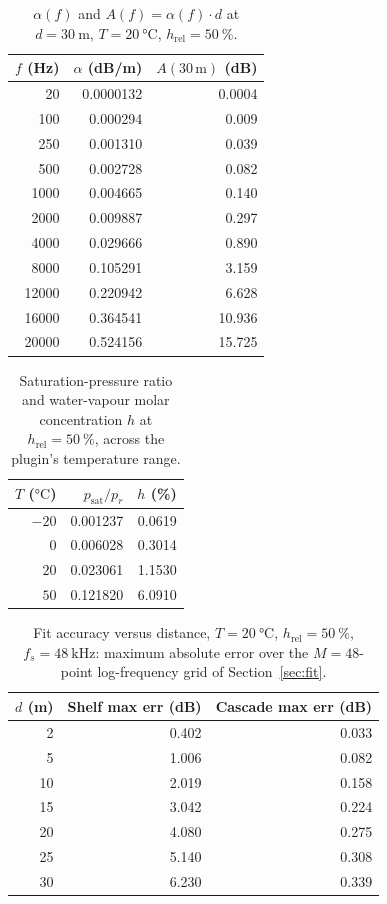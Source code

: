 \documentclass[11pt,a4paper]{article}
\begin{document}
\begin{table}[h]
\centering
\caption{$\alpha(f)$ and $A(f)=\alpha(f)\cdot d$ at $d=\SI{30}{\meter}$, $T=\SI{20}{\celsius}$, $h_\text{rel}=\SI{50}{\percent}$.}
\label{tab:alpha20}
\begin{tabular}{@{}rrr@{}}
\toprule
$f$ (Hz) & $\alpha$ (dB/m) & $A(30\,\text{m})$ (dB) \\
\midrule
20     & 0.0000132 & 0.0004 \\
100    & 0.000294  & 0.009  \\
250    & 0.001310  & 0.039  \\
500    & 0.002728  & 0.082  \\
1000   & 0.004665  & 0.140  \\
2000   & 0.009887  & 0.297  \\
4000   & 0.029666  & 0.890  \\
8000   & 0.105291  & 3.159  \\
12000  & 0.220942  & 6.628  \\
16000  & 0.364541  & 10.936 \\
20000  & 0.524156  & 15.725 \\
\bottomrule
\end{tabular}
\end{table}

\begin{table}[h]
\centering
\caption{Saturation-pressure ratio and water-vapour molar concentration $h$ at $h_\text{rel}=\SI{50}{\percent}$, across the plugin's temperature range.}
\label{tab:humidity}
\begin{tabular}{@{}rrr@{}}
\toprule
$T$ ($\si{\celsius}$) & $p_\text{sat}/p_r$ & $h$ (\%) \\
\midrule
$-20$ & 0.001237 & 0.0619 \\
$0$   & 0.006028 & 0.3014 \\
$20$  & 0.023061 & 1.1530 \\
$50$  & 0.121820 & 6.0910 \\
\bottomrule
\end{tabular}
\end{table}

\begin{table}[h]
\centering
\caption{Fit accuracy versus distance, $T=\SI{20}{\celsius}$, $h_\text{rel}=\SI{50}{\percent}$, $f_s=\SI{48}{\kilo\hertz}$: maximum absolute error over the $M=48$-point log-frequency grid of Section~\ref{sec:fit}.}
\label{tab:fitdist}
\begin{tabular}{@{}rrr@{}}
\toprule
$d$ (m) & Shelf max err (dB) & Cascade max err (dB) \\
\midrule
2  & 0.402 & 0.033 \\
5  & 1.006 & 0.082 \\
10 & 2.019 & 0.158 \\
15 & 3.042 & 0.224 \\
20 & 4.080 & 0.275 \\
25 & 5.140 & 0.308 \\
30 & 6.230 & 0.339 \\
\bottomrule
\end{tabular}
\end{table}
\end{document}
